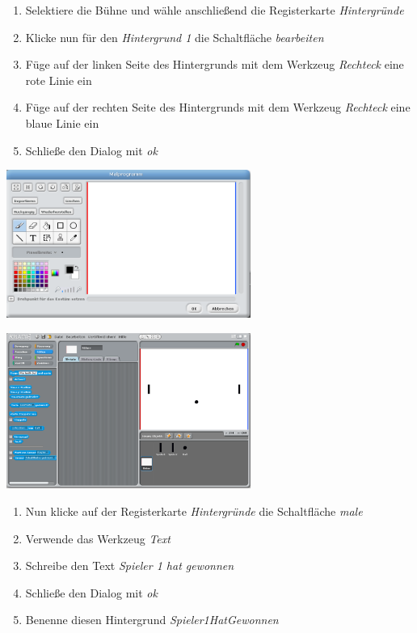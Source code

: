 \begin{enumerate}
\item Selektiere die Bühne und wähle anschließend die Registerkarte \textit{Hintergründe}
\item Klicke nun für den \textit{Hintergrund 1} die Schaltfläche \textit{bearbeiten}
\item Füge auf der linken Seite des Hintergrunds mit dem Werkzeug \textit{Rechteck} eine rote Linie ein 
\item Füge auf der rechten Seite des Hintergrunds mit dem Werkzeug \textit{Rechteck} eine blaue Linie ein
\item Schließe den Dialog mit \textit{ok}
\end{enumerate}

\includegraphics[width=0.6\textwidth]{images/aufgabe5_pong_hintergrund_malen.png}

\includegraphics[width=0.6\textwidth]{images/aufgabe5_pong_hintergrund_1.png}


\begin{enumerate}\addtocounter{enumi}{5}
\item Nun klicke auf der Registerkarte \textit{Hintergründe} die Schaltfläche \textit{male}
\item Verwende das Werkzeug \textit{Text} 
\item Schreibe den Text \textit{Spieler 1 hat gewonnen}
\item Schließe den Dialog mit \textit{ok}
\item Benenne diesen Hintergrund \textit{Spieler1HatGewonnen}
\end{enumerate}

